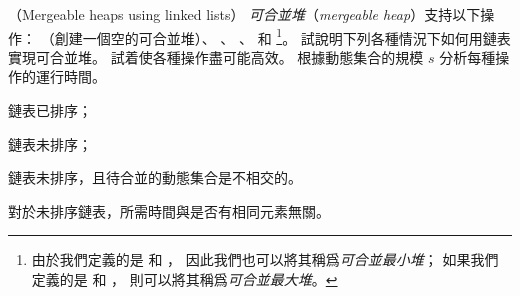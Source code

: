 \startPROBLEM
（Mergeable heaps using linked lists）
\emph{可合並堆}（\emph{mergeable heap}）支持以下操作：
 （創建一個空的可合並堆）、
 、 、  和 
\footnote{%
由於我們定義的是  和 ，
因此我們也可以將其稱爲\emph{可合並最小堆}；
如果我們定義的是  和 ，
則可以將其稱爲\emph{可合並最大堆}。
}。
試說明下列各種情況下如何用鏈表實現可合並堆。
試着使各種操作盡可能高效。
根據動態集合的規模 $s$ 分析每種操作的運行時間。
\startigBase[a]
\item 鏈表已排序；
\item 鏈表未排序；
\item 鏈表未排序，且待合並的動態集合是不相交的。
\stopigBase
\stopPROBLEM

\startANSWER
{}

對於未排序鏈表，所需時間與是否有相同元素無關。
\stopANSWER
